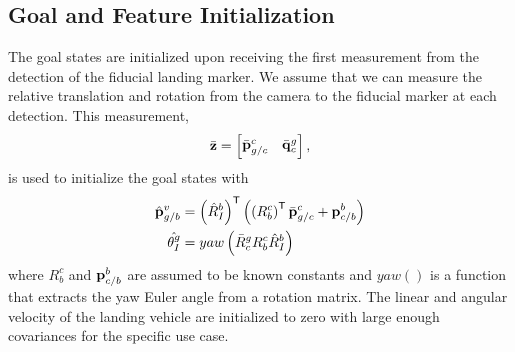 
\subsection{Goal and Feature Initialization}
The goal states are initialized upon receiving the first measurement from
the detection of the fiducial landing marker. We assume that we can measure the
relative translation and rotation from the camera to the fiducial marker
at each detection. This measurement,
\begin{equation}
  \bar{\vect{z}} =
  \begin{bmatrix}
    \bar{\vect{p}}_{g/c}^c & \bar{\vect{q}}_c^g
  \end{bmatrix},
  \label{eq:fiducial_meas}
\end{equation}
is used to initialize the goal states with
\begin{align}
  \hat{\boldsymbol{\mathrm{p}}}_{g/b}^v &= \left( \hat{R}_I^b \right)^{\mathsf{T}} \left( \left ( R_b^c
  \right)^{\mathsf{T}} \bar{\boldsymbol{\mathrm{p}}}_{g/c}^c + \boldsymbol{\mathrm{p}}_{c/b}^b
\right)   \\
      \hat{\theta_I^g} &= yaw \left( \bar{R}_c^g R_b^c \hat{R}_I^b \right)
\end{align}
where $R_b^c$ and $\boldsymbol{\mathrm{p}}_{c/b}^b$ are assumed to be known constants and
$yaw()$ is a function that extracts the yaw Euler angle from a rotation matrix.
The linear and angular velocity of the landing vehicle are initialized to
zero with large enough covariances for the specific use case.

